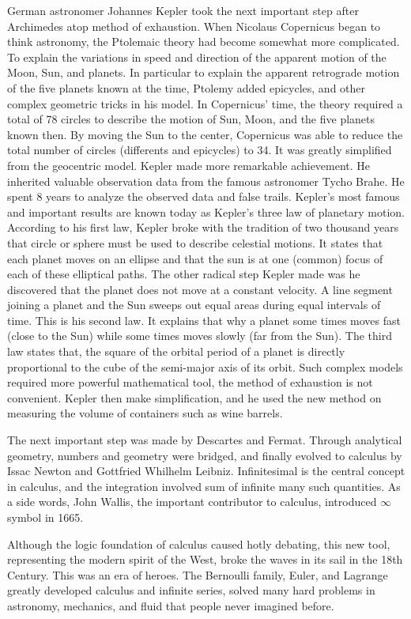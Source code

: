 \documentclass{article}
\begin{document}
German astronomer Johannes Kepler took the next important step after Archimedes atop method of exhaustion. When Nicolaus Copernicus began to think astronomy, the Ptolemaic theory had become somewhat more complicated. To explain the variations in speed and direction of the apparent motion of the Moon, Sun, and planets. In particular to explain the apparent retrograde motion of the five planets known at the time, Ptolemy added epicycles, and other complex geometric tricks in his model. In Copernicus' time, the theory required a total of 78 circles to describe the motion of Sun, Moon, and the five planets known then. By moving the Sun to the center, Copernicus was able to reduce the total number of circles (differents and epicycles) to 34. It was greatly simplified from the geocentric model. Kepler made more remarkable achievement. He inherited valuable observation data from the famous astronomer Tycho Brahe. He spent 8 years to analyze the observed data and false trails. Kepler's most famous and important results are known today as Kepler's three law of planetary motion. According to his first law, Kepler broke with the tradition of two thousand years that circle or sphere must be used to describe celestial motions. It states that each planet moves on an ellipse and that the sun is at one (common) focus of each of these elliptical paths. The other radical step Kepler made was he discovered that the planet does not move at a constant velocity. A line segment joining a planet and the Sun sweeps out equal areas during equal intervals of time. This is his second law. It explains that why a planet some times moves fast (close to the Sun) while some times moves slowly (far from the Sun). The third law states that, the square of the orbital period of a planet is directly proportional to the cube of the semi-major axis of its orbit. Such complex models required more powerful mathematical tool, the method of exhaustion is not convenient. Kepler then make simplification, and he used the new method on measuring the volume of containers such as wine barrels.

The next important step was made by Descartes and Fermat. Through analytical geometry, numbers and geometry were bridged, and finally evolved to calculus by Issac Newton and Gottfried Whilhelm Leibniz. Infinitesimal is the central concept in calculus, and the integration involved sum of infinite many such quantities. As a side words, John Wallis, the important contributor to calculus, introduced $\infty$ symbol in 1665.

Although the logic foundation of calculus caused hotly debating, this new tool, representing the modern spirit of the West, broke the waves in its sail in the 18th Century. This was an era of heroes. The Bernoulli family, Euler, and Lagrange greatly developed calculus and infinite series, solved many hard problems in astronomy, mechanics, and fluid that people never imagined before.
\end{document}
